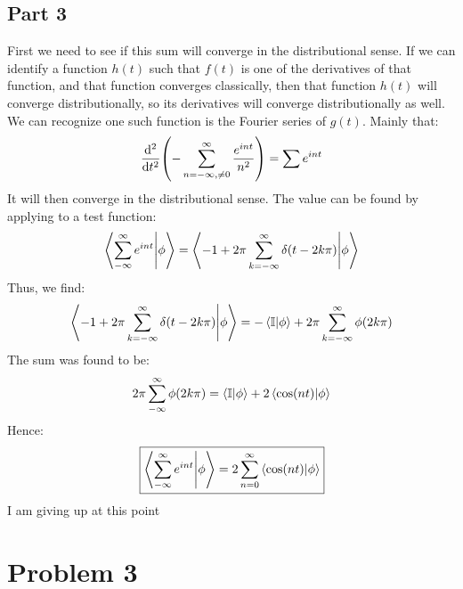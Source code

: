 \documentclass[12pt]{article}
\begin{document}
\subsection*{Part 3}
First we need to see if this sum will converge in the distributional sense. If we can identify a function $h(t)$ such that $f(t)$ is one of the derivatives of that function, and that function converges classically, then that function $h(t)$ will converge distributionally, so its derivatives will converge distributionally as well. We can recognize one such function is the Fourier series of $g(t)$. Mainly that:
\begin{align*}
  \dv[2]{t}\qty(-\sum_{n=-\infty,\neq0}^\infty\frac{e^{int}}{n^2})=\sum e^{int}
\end{align*}
It will then converge in the distributional sense. The value can be found by applying to a test function:
\begin{align}
  \ip{\sum_{-\infty}^\infty e^{int}}{\phi}
  =\ip{-1+2\pi\sum_{k=-\infty}^{\infty}\delta(t-2k\pi)}{\phi}
\end{align}
Thus, we find:
\begin{align*}
  \ip{-1+2\pi\sum_{k=-\infty}^{\infty}\delta(t-2k\pi)}{\phi}
  =-\ip{\mathbb{I}}{\phi}+2\pi\sum_{k=-\infty}^{\infty}\phi(2k\pi)
\end{align*}
The sum was found to be:
\begin{align*}
  2\pi\sum_{-\infty}^\infty\phi(2k\pi)=\ip{\mathbb{I}}{\phi}+2\ip{\cos(nt)}{\phi}
\end{align*}
Hence:
\begin{align}
  \boxed{
    \ip{\sum_{-\infty}^\infty e^{int}}{\phi}=2\sum_{n=0}^\infty\ip{\cos(nt)}{\phi}
  }
\end{align}
I am giving up at this point
\newpage
\section*{Problem 3}
\end{document}
